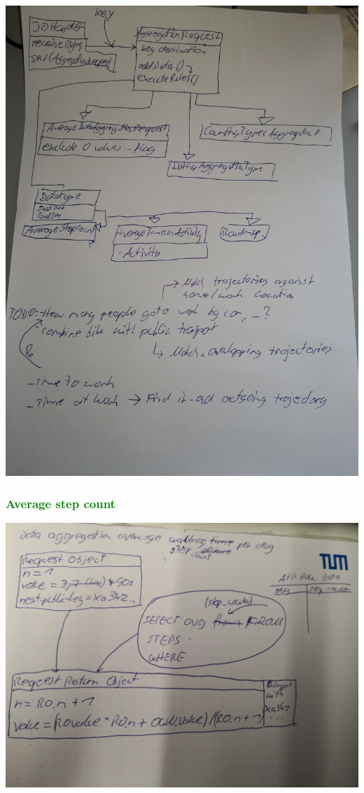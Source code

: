 \includegraphics[width=\textwidth]{data/class-diagram-data-aggregation-requests.jpg}

\subsubsection{\textcolor{green}{Average step count}}
\includegraphics[width=\textwidth]{data/data-aggregation-average-step.jpg}

